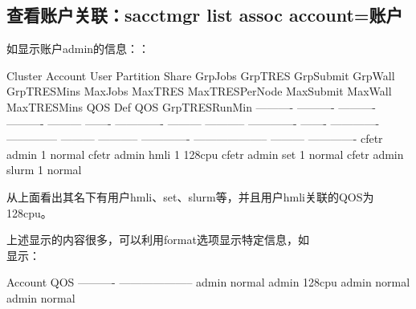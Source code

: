 \subsection{查看账户关联：sacctmgr list assoc account=账户}
如显示账户admin的信息：：
\begin{OUT}
  Cluster    Account       User  Partition     Share GrpJobs       GrpTRES GrpSubmit     GrpWall   GrpTRESMins MaxJobs       MaxTRES MaxTRESPerNode MaxSubmit     MaxWall   MaxTRESMins                  QOS   Def QOS GrpTRESRunMin
---------- ---------- ---------- ---------- --------- ------- ------------- --------- ----------- ------------- ------- ------------- -------------- --------- ----------- ------------- -------------------- --------- -------------
     cfetr      admin                               1                                                                                                                                                  normal
     cfetr      admin       hmli                    1                                                                                                                                                  128cpu
     cfetr      admin        set                    1                                                                                                                                                  normal
     cfetr      admin      slurm                    1                                                                                                                                                  normal
\end{OUT}

从上面看出其名下有用户hmli、set、slurm等，并且用户hmli关联的QOS为128cpu。

上述显示的内容很多，可以利用format选项显示特定信息，如\\显示：
\begin{OUT}
   Account                  QOS
---------- --------------------
     admin               normal
     admin               128cpu
     admin               normal
     admin               normal
\end{OUT}


